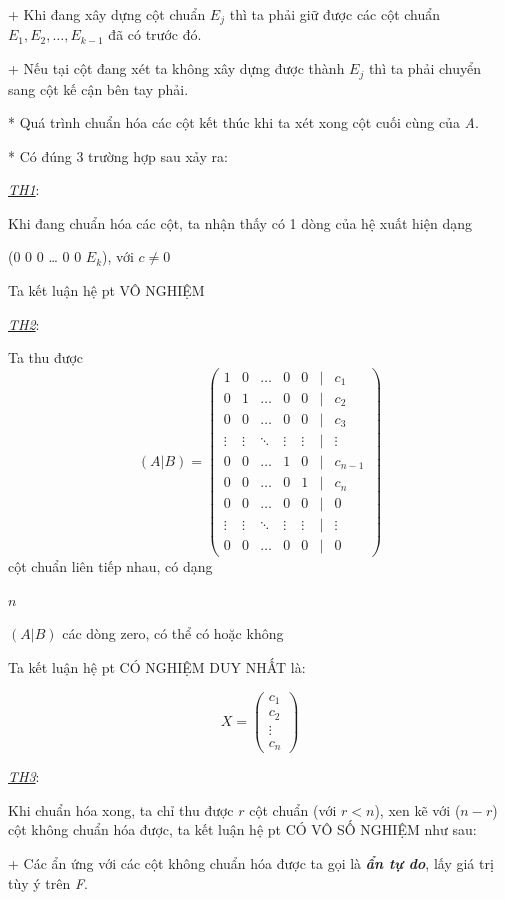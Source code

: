\documentclass[12pt,a4paper]{article}
\let\ul\uline
\begin{document}
+ Khi đang xây dựng cột chuẩn $E_j$ thì ta
phải giữ được các cột chuẩn $E_1, E_2, \dots, E_{k-1}$ đã có
trước đó.

+ Nếu tại cột đang xét ta không xây dựng được thành
$E_j$ thì ta phải chuyển sang cột kế cận
bên tay phải.

* Quá trình chuẩn hóa các cột kết thúc khi ta xét xong cột cuối cùng của
\emph{A}.

* Có đúng 3 trường hợp sau xảy ra:

\emph{\ul{TH1}}:

Khi đang chuẩn hóa các cột, ta nhận thấy có 1 dòng của hệ xuất hiện dạng

(0 0 0 \ldots{} 0 0 \textbar{} $E_k$), với
$c \neq 0$

Ta kết luận hệ pt VÔ NGHIỆM

\emph{\ul{TH2}}:

Ta thu được $$(A|B) = \begin{pmatrix} 1 & 0 & \dots & 0 & 0 & | & c_1 \\ 0 & 1 & \dots & 0 & 0 & | & c_2 \\ 0 & 0 & \dots & 0 & 0 & | & c_3 \\ \vdots & \vdots & \ddots & \vdots & \vdots & | & \vdots \\ 0 & 0 & \dots & 1 & 0 & | & c_{n-1} \\ 0 & 0 & \dots & 0 & 1 & | & c_n \\ 0 & 0 & \dots & 0 & 0 & | & 0 \\ \vdots & \vdots & \ddots & \vdots & \vdots & | & \vdots \\ 0 & 0 & \dots & 0 & 0 & | & 0 \end{pmatrix}$$ cột chuẩn liên tiếp
nhau, có dạng

$n$

$(A|B)$ các dòng zero, có thể có hoặc không

Ta kết luận hệ pt CÓ NGHIỆM DUY NHẤT là:

$$X = \begin{pmatrix} c_1 \\ c_2 \\ \vdots \\ c_n \end{pmatrix}$$

\emph{\ul{TH3}}:

Khi chuẩn hóa xong, ta chỉ thu được $r$
cột chuẩn (với $r < n$), xen kẽ với
($n-r$) cột không chuẩn hóa được, ta kết
luận hệ pt CÓ VÔ SỐ NGHIỆM như sau:

+ Các ẩn ứng với các cột không chuẩn hóa được ta gọi là \emph{\textbf{ẩn
tự do}}, lấy giá trị tùy ý trên \emph{F}.
\end{document}
